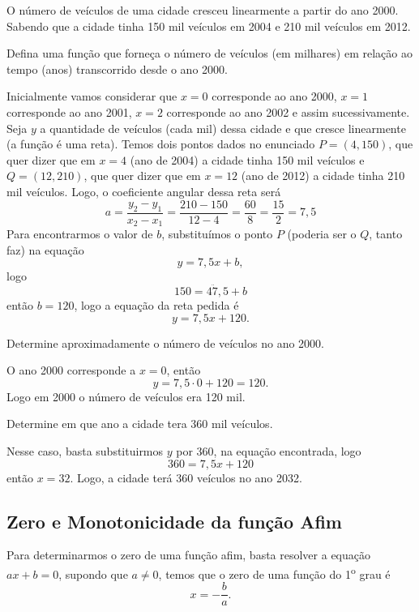 \begin{example}\label{ex1}
  O número de veículos de uma cidade cresceu linearmente a partir do ano
  2000. Sabendo que a cidade tinha 150 mil veículos em 2004 e 210 mil
  veículos em 2012.

  \solution
  Defina uma função que forneça o número de veículos (em milhares)
  em relação ao tempo (anos) transcorrido desde o ano 2000.

  Inicialmente vamos considerar que $x=0$ corresponde ao ano 2000, $x=1$
  corresponde ao ano 2001, $x=2$ corresponde ao ano 2002 e assim
  sucessivamente. Seja $y$ a quantidade de veículos (cada mil) dessa cidade
  e que cresce linearmente (a função é uma reta). Temos dois pontos dados
  no enunciado $P=(4, 150)$, que quer dizer que em $x=4$ (ano de 2004) a
  cidade tinha 150 mil veículos e $Q=(12, 210)$, que quer dizer que em
  $x=12$ (ano de 2012) a cidade tinha 210 mil veículos. Logo, o
  coeficiente angular dessa reta será
  \[
    a
    = \frac{y_2-y_1}{x_2-x_1}
    = \frac{210-150}{12-4}
    = \frac{60}{8}
    = \frac{15}{2}
    = 7,5
  \]
  Para encontrarmos o valor de $b$, substituímos o ponto $P$
  (poderia ser o $Q$, tanto faz)
  na equação
  \[
    y = 7,5x + b,
  \]
  logo
  \[
    150 =4 \ddot 7,5 + b
  \]
  então $b=120$, logo a equação da reta pedida é
  \[
    y = 7,5x + 120.
  \]

  Determine aproximadamente o número de veículos no ano 2000.

  O ano 2000 corresponde a $x=0$, então
  \[
    y = 7,5 \cdot 0 + 120 = 120.
  \]
  Logo em 2000 o número de veículos era 120 mil.

  Determine em que ano a cidade tera 360 mil veículos.

  Nesse caso, basta substituirmos $y$ por 360, na equação encontrada, logo
  \[
    360 = 7,5x + 120
  \]
  então $x=32$. Logo, a cidade terá 360 veículos no ano 2032.
\end{example}

\subsection{Zero e Monotonicidade da função Afim}

Para determinarmos o zero de uma função afim, basta resolver a equação
$ax+b=0$, supondo que $a \neq 0$, temos que o zero de uma função
do 1\textsuperscript{o} grau é
\[
  x = -\frac{b}{a}.
\]

